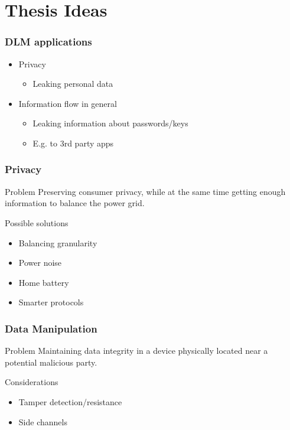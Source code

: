 
\section{Thesis Ideas}

\begin{frame}
  \frametitle{DLM applications}

  \begin{itemize}
    \item Privacy
    \begin{itemize}
      \item Leaking personal data
    \end{itemize}
    \item Information flow in general
    \begin{itemize}
      \item Leaking information about passwords/keys
      \item E.g. to 3rd party apps
    \end{itemize}
  \end{itemize}
\end{frame}

\begin{frame}
  \frametitle{Privacy}

  \begin{block}{Problem}
    Preserving consumer privacy, while at the same time getting enough information to balance the power grid.
  \end{block}

  \begin{block}{Possible solutions}
    \begin{itemize}
      \item Balancing granularity
      \item Power noise
      \item Home battery
      \item Smarter protocols
    \end{itemize}
  \end{block}
\end{frame}

\begin{frame}
  \frametitle{Data Manipulation}

  \begin{block}{Problem}
    Maintaining data integrity in a device physically located near a potential malicious party.
  \end{block}

  \begin{block}{Considerations}
    \begin{itemize}
      \item Tamper detection/resistance
      \item Side channels
    \end{itemize}
  \end{block}
\end{frame}
